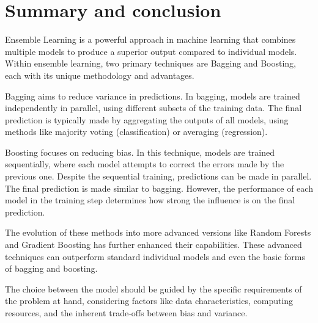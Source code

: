 \section{Summary and conclusion}
Ensemble Learning is a powerful approach in machine learning that combines 
multiple models to produce a superior output compared to individual models.
Within ensemble learning, two primary techniques are Bagging and Boosting, 
each with its unique methodology and advantages.


Bagging aims to reduce variance in predictions. In bagging, models are trained 
independently in parallel, using different subsets of the training data.
The final prediction is typically made by aggregating the outputs of all models,
using methods like majority voting (classification) or averaging (regression).


Boosting focuses on reducing bias. In this technique, models are trained sequentially,
where each model attempts to correct the errors made by the previous one. Despite 
the sequential training, predictions can be made in parallel. The final prediction
is made similar to bagging. However, the performance of each model in the training 
step determines how strong the influence is on the final prediction.


The evolution of these methods into more advanced versions like Random Forests
and Gradient Boosting has further enhanced their capabilities. These advanced 
techniques can outperform standard individual models and even the basic forms 
of bagging and boosting. 


The choice between the model should be guided by the specific requirements of 
the problem at hand, considering factors like data characteristics, computing 
resources, and the inherent trade-offs between bias and variance.
